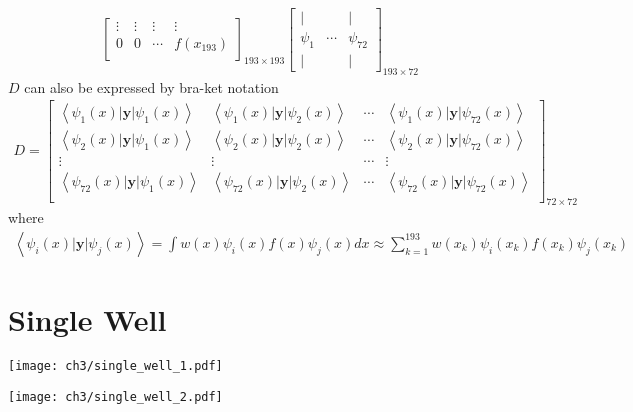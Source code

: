 \begin{definition}
\begin{align*}
\begin{bmatrix}
          \vdots & \vdots & \vdots & \vdots \\
          0 & 0 & \cdots & f(x_{193}) \\
          \end{bmatrix}_{193 \times 193}
          \begin{bmatrix}
                \vert & & \vert \\
                \psi_1   & \cdots & \psi_{72} \\
                \vert &  & \vert
          \end{bmatrix}_{193 \times 72}    
\end{align*}
$D$ can also be expressed by bra-ket notation
\begin{align*}
        D=\begin{bmatrix}
                \left< \psi_1(x) | \textbf{y} | \psi_1(x) \right> & \left< \psi_1(x) | \textbf{y} | \psi_2(x) \right> & \cdots & \left< \psi_1(x) | \textbf{y} | \psi_{72}(x) \right> \\
                \left< \psi_2(x) | \textbf{y} | \psi_1(x) \right> & \left< \psi_2(x) | \textbf{y} | \psi_2(x) \right> & \cdots & \left< \psi_2(x) | \textbf{y} | \psi_{72}(x) \right> \\
                \vdots & \vdots & \cdots & \vdots \\
                \left< \psi_{72}(x) | \textbf{y} | \psi_1(x) \right> & \left< \psi_{72}(x) | \textbf{y} | \psi_2(x) \right> & \cdots & \left< \psi_{72}(x) | \textbf{y} | \psi_{72}(x) \right> \\
                \end{bmatrix}_{72 \times 72}
\end{align*}
where
\begin{align*}
        \left< \psi_i(x) | \textbf{y} | \psi_j(x) \right> = \int w(x) \psi_i(x) f(x) \psi_j(x) dx \approx \sum_{k=1}^{193} w(x_k) \psi_i(x_k) f(x_k) \psi_j(x_k)
\end{align*}
\end{definition}

\section{Single Well}
\begin{center}
        \texttt{[image: ch3/single\_well\_1.pdf]}   
\end{center}
\begin{center}
        \texttt{[image: ch3/single\_well\_2.pdf]}   
\end{center}

